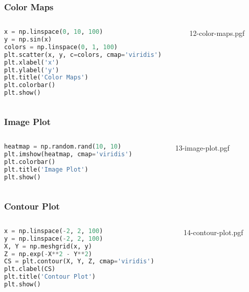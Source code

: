 \documentclass[beamer, en, version=2.0]{huangfusl-template}
\begin{document}
    \begin{frame}[fragile]
        \frametitle{Color Maps}

        \begin{columns}
        \begin{column}{0.5\textwidth}
\begin{lstlisting}[language=python, breaklines]
x = np.linspace(0, 10, 100)
y = np.sin(x)
colors = np.linspace(0, 1, 100)
plt.scatter(x, y, c=colors, cmap='viridis')
plt.xlabel('x')
plt.ylabel('y')
plt.title('Color Maps')
plt.colorbar()
plt.show()
\end{lstlisting}
        \end{column}
        \begin{column}{0.5\textwidth}
            {12-color-maps.pgf}
        \end{column}
        \end{columns}
    \end{frame}
    \begin{frame}[fragile]
        \frametitle{Image Plot}

        \begin{columns}
        \begin{column}{0.5\textwidth}
\begin{lstlisting}[language=python, breaklines]
heatmap = np.random.rand(10, 10)
plt.imshow(heatmap, cmap='viridis')
plt.colorbar()
plt.title('Image Plot')
plt.show()
\end{lstlisting}
        \end{column}
        \begin{column}{0.5\textwidth}
            {13-image-plot.pgf}
        \end{column}
        \end{columns}
    \end{frame}
    \begin{frame}[fragile]
        \frametitle{Contour Plot}

        \begin{columns}
        \begin{column}{0.5\textwidth}
\begin{lstlisting}[language=python, breaklines]
x = np.linspace(-2, 2, 100)
y = np.linspace(-2, 2, 100)
X, Y = np.meshgrid(x, y)
Z = np.exp(-X**2 - Y**2)
CS = plt.contour(X, Y, Z, cmap='viridis')
plt.clabel(CS)
plt.title('Contour Plot')
plt.show()
\end{lstlisting}
        \end{column}
        \begin{column}{0.5\textwidth}
            {14-contour-plot.pgf}
        \end{column}
        \end{columns}
    \end{frame}
\end{document}
